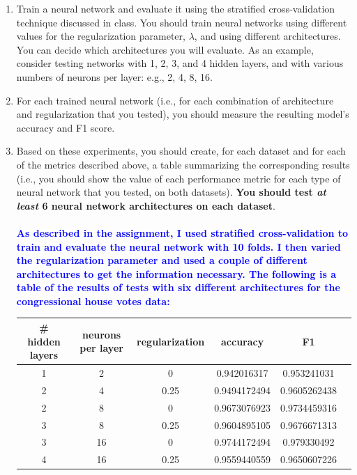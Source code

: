\documentclass[letterpaper]{article}
\newcommand{\HIGHLIGHT}[1]{\textcolor{blue}{\textbf{#1}}}
\begin{document}
\begin{enumerate}
    \item Train a neural network and evaluate it using the stratified cross-validation technique discussed in class. You should train neural networks using different values for the regularization parameter, $\lambda$, and using different architectures. You can decide which architectures you will evaluate. As an example, consider testing networks with 1, 2, 3, and 4 hidden layers, and with various numbers of neurons per layer: e.g., 2, 4, 8, 16.
    \item For each trained neural network (i.e., for each combination of architecture and regularization that you tested), you should measure the resulting model's accuracy and F1 score. 
    \item Based on these experiments, you should create, for each dataset and for each of the metrics described above, a table summarizing the corresponding results (i.e., you should show the value of each performance metric for each type of neural network that you tested, on both datasets). \textbf{You should test \textit{at least} 6 neural network architectures on each dataset}. \\ \\
    
    
\HIGHLIGHT{As described in the assignment, I used stratified cross-validation to train and evaluate the neural network with 10 folds. I then varied the regularization parameter and used a couple of different architectures to get the information necessary. The following is a table of the results of tests with six different architectures for the congressional house votes data:} \\

\begin{tabular}{|c|c|c|c|c|c|}
\hline
\# hidden layers & neurons per layer & regularization & accuracy & F1 \\
\hline
1 & 2 & 0 & 0.942016317 & 0.953241031 \\
\hline
2 & 4 & 0.25 & 0.9494172494 & 0.9605262438 \\
\hline
2 & 8 & 0 & 0.9673076923 & 0.9734459316 \\
\hline
3 & 8 & 0.25 & 0.9604895105 & 0.9676671313 \\
\hline
3 & 16 & 0 & 0.9744172494 & 0.979330492 \\
\hline
4 & 16 & 0.25 & 0.9559440559 & 0.9650607226 \\
\hline
\end{tabular} \\ \\



\end{enumerate}
\end{document}
